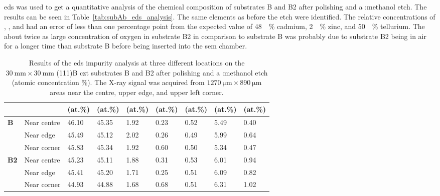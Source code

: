 \Ac{eds} was used to get a quantitative analysis of the chemical composition of substrates B and B2 after polishing and a :methanol etch. The results can be seen in Table~\ref{tab:subAb_eds_analysis}. The same elements as before the etch were identified. The relative concentrations of , , and  had an error of less than one percentage point from the expected value of \SI{48}{\atomic\percent} cadmium, \SI{2}{\atomic\percent} zinc, and \SI{50}{\atomic\percent} tellurium. The about twice as large concentration of oxygen in substrate B2 in comparison to substrate B was probably due to substrate B2 being in air for a longer time than substrate B before being inserted into the \ac{sem} chamber. 

\begin{table}[htbp]
    \centering
    \caption[\Ac{eds} impurity analysis of substrate B with surface pre-growth preparation.]{Results of the \ac{eds} impurity analysis at three different locations on the $\SI{30}{\milli\metre}\times\SI{30}{\milli\metre}$ (111)B \ac{czt} substrates B and B2 after polishing and a :methanol etch (atomic concentration \%). The X-ray signal was acquired from $\SI{1270}{\micro\metre}\times\SI{890}{\micro\metre}$ areas near the centre, upper edge, and upper left corner.}\label{tab:subBb_eds_analysis}
    \begin{tabu} to 1.0\textwidth { X[0.5,l] X[1.85,r] X[1.125,c] X[1.125,c] X[1.125,c] X[1.125,c] X[1.125,c] X[1.125,c] X[1.125,c] }
    \hline
         & & \textbf{} (at.\%) & \textbf{} (at.\%) & \textbf{} (at.\%) & \textbf{ } (at.\%) & \textbf{} (at.\%) & \textbf{} (at.\%) & \textbf{} (at.\%) \\
        \hline
        \textbf{B} &Near centre  & \SI{46.10}{} & \SI{45.35}{} & \SI{1.92}{} & \SI{0.23}{} & \SI{0.52}{} & \SI{5.49}{} & \SI{0.40}{} \\ %
        &Near edge & \SI{45.49}{} & \SI{45.12}{} & \SI{2.02}{} & \SI{0.26}{} & \SI{0.49}{} & \SI{5.99}{} & \SI{0.64}{} \\ %
        &Near corner & \SI{45.83}{} & \SI{45.34}{} & \SI{1.92}{} & \SI{0.60}{} & \SI{0.50}{} & \SI{5.34}{} & \SI{0.47}{} \\ %
        \hline
        \textbf{B2} &Near centre  & \SI{45.23}{} & \SI{45.11}{} & \SI{1.88}{} & \SI{0.31}{} & \SI{0.53}{} & \SI{6.01}{} & \SI{0.94}{} \\ %
        &Near edge & \SI{45.41}{} & \SI{45.20}{} & \SI{1.71}{} & \SI{0.25}{} & \SI{0.51}{} & \SI{6.09}{} & \SI{0.82}{} \\ %
        &Near corner & \SI{44.93}{} & \SI{44.88}{} & \SI{1.68}{} & \SI{0.68}{} & \SI{0.51}{} & \SI{6.31}{} & \SI{1.02}{} \\ %
         \hline
    \end{tabu}
\end{table}

